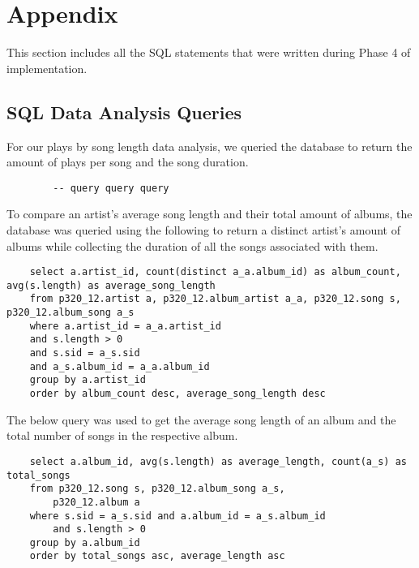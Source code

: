 \documentclass[12pt]{article}
\begin{document}
    \section{Appendix}

    This section includes all the SQL statements that were written during Phase 4 of
    implementation.

    \subsection{SQL Data Analysis Queries}


    \noindent For our plays by song length data analysis, we queried the
    database to return the amount of plays per song and the song duration.

    \begin{lstlisting}
        -- query query query
    \end{lstlisting}

    \noindent To compare an artist's average song length and their total amount
    of albums, the database was queried using the following to return
    a distinct artist's amount of albums while collecting the duration of all
    the songs associated with them.
    
    \begin{lstlisting}
    select a.artist_id, count(distinct a_a.album_id) as album_count, avg(s.length) as average_song_length
    from p320_12.artist a, p320_12.album_artist a_a, p320_12.song s, p320_12.album_song a_s
    where a.artist_id = a_a.artist_id
    and s.length > 0
    and s.sid = a_s.sid
    and a_s.album_id = a_a.album_id
    group by a.artist_id
    order by album_count desc, average_song_length desc

    \end{lstlisting}

    \noindent The below query was used to get the average song length
    of an album and the total number of songs in the respective album.

    \begin{lstlisting}
    select a.album_id, avg(s.length) as average_length, count(a_s) as total_songs
    from p320_12.song s, p320_12.album_song a_s,
        p320_12.album a
    where s.sid = a_s.sid and a.album_id = a_s.album_id
        and s.length > 0
    group by a.album_id
    order by total_songs asc, average_length asc
    \end{lstlisting}
\end{document}
